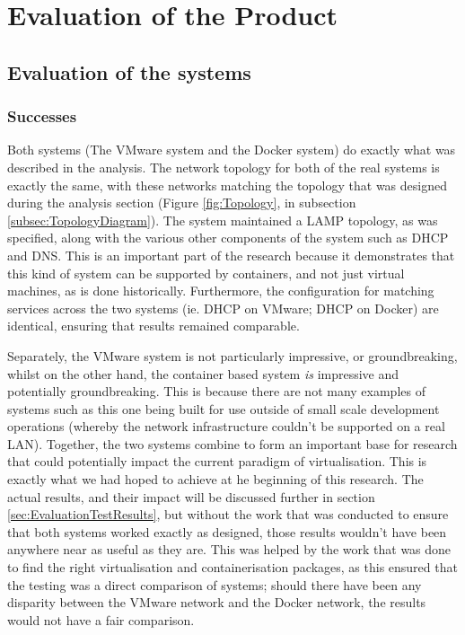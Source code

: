 

\chapter{Evaluation of the Product}
\section{Evaluation of the systems}
\subsection{Successes}
Both systems (The VMware system and the Docker system) do exactly what was described in the analysis. The network topology for both of the real systems is exactly the same, with these networks matching the topology that was designed during the analysis section (Figure \ref{fig:Topology}, in subsection \ref{subsec:TopologyDiagram}). The system maintained a LAMP topology, as was specified, along with the various other components of the system such as DHCP and DNS. This is an important part of the research because it demonstrates that this kind of system can be supported by containers, and not just virtual machines, as is done historically. Furthermore, the configuration for matching services across the two systems (ie. DHCP on VMware; DHCP on Docker) are identical, ensuring that results remained comparable.

Separately, the VMware system is not particularly impressive, or groundbreaking, whilst on the other hand, the container based system \emph{is} impressive and potentially groundbreaking. This is because there are not many examples of systems such as this one being built for use outside of small scale development operations (whereby the network infrastructure couldn't be supported on a real LAN). Together, the two systems combine to form an important base for research that could potentially impact the current paradigm of virtualisation. This is exactly what we had hoped to achieve at he beginning of this research. The actual results, and their impact will be discussed further in section \ref{sec:EvaluationTestResults}, but without the work that was conducted to ensure that both systems worked exactly as designed, those results wouldn't have been anywhere near as useful as they are. This was helped by the work that was done to find the right virtualisation and containerisation packages, as this ensured that the testing was a direct comparison of systems; should there have been any disparity between the VMware network and the Docker network, the results would not have  a fair comparison.

